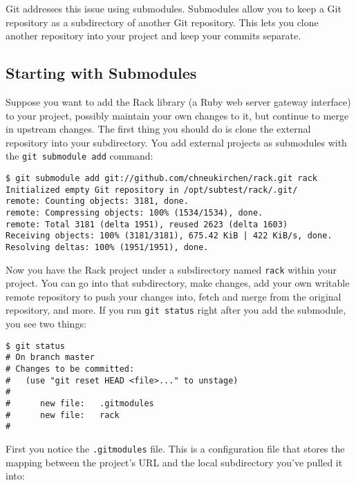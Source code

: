 \documentclass[a4paper]{book}
\newcounter{tab}[chapter]
\begin{document}
Git addresses this issue using submodules. Submodules allow you to keep a Git repository as a subdirectory of another Git repository. This lets you clone another repository into your project and keep your commits separate.

\subsection{Starting with Submodules}\label{starting-with-submodules}

Suppose you want to add the Rack library (a Ruby web server gateway interface) to your project, possibly maintain your own changes to it, but continue to merge in upstream changes. The first thing you should do is clone the external repository into your subdirectory. You add external projects as submodules with the \texttt{git submodule add} command:

\begin{shaded}\begin{verbatim}
$ git submodule add git://github.com/chneukirchen/rack.git rack
Initialized empty Git repository in /opt/subtest/rack/.git/
remote: Counting objects: 3181, done.
remote: Compressing objects: 100% (1534/1534), done.
remote: Total 3181 (delta 1951), reused 2623 (delta 1603)
Receiving objects: 100% (3181/3181), 675.42 KiB | 422 KiB/s, done.
Resolving deltas: 100% (1951/1951), done.
\end{verbatim}\end{shaded}

Now you have the Rack project under a subdirectory named \texttt{rack} within your project. You can go into that subdirectory, make changes, add your own writable remote repository to push your changes into, fetch and merge from the original repository, and more. If you run \texttt{git status} right after you add the submodule, you see two things:

\begin{shaded}\begin{verbatim}
$ git status
# On branch master
# Changes to be committed:
#   (use "git reset HEAD <file>..." to unstage)
#
#      new file:   .gitmodules
#      new file:   rack
#
\end{verbatim}\end{shaded}

First you notice the \texttt{.gitmodules} file. This is a configuration file that stores the mapping between the project's URL and the local subdirectory you've pulled it into:
\end{document}

